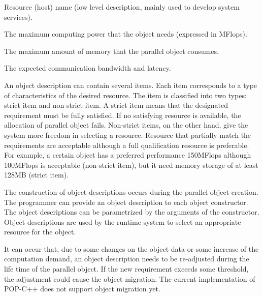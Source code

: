 \begin{petitem}

\item Resource (host) name (low level description, mainly used to
develop system services).

\item The maximum computing power that the object needs (expressed in
MFlops).

\item The maximum amount of memory that the parallel object consumes.

\item The expected communication bandwidth and latency.

\end{petitem}

An object description can contain several items. Each item corresponds
to a type of characteristics of the desired resource. The item is
classified into two types: strict item and non-strict item. A strict
item means that the designated requirement must be fully satisfied. If
no satisfying resource is available, the allocation of parallel object
fails. Non-strict items, on the other hand, give the system more freedom
in selecting a resource. Resource that partially match the requirements
are acceptable although a full qualification resource is  preferable.
For example, a certain object has a preferred performance 150MFlops
although 100MFlops is acceptable (non-strict item), but it need memory
storage of at least 128MB (strict item).

The construction of object descriptions occurs during the parallel
object creation. The programmer can provide an object description to
each object constructor. The object descriptions can be parametrized by
the arguments of the constructor. Object descriptions are used by the
runtime system to select an appropriate resource for the object.

It can occur that, due to some changes on the object data or some
increase of the computation demand, an object description needs to be
re-adjusted during the life time of the parallel object. If the new
requirement exceeds some threshold, the adjustment could cause the
object migration. The current implementation of POP-C++ does not support
object migration yet.


